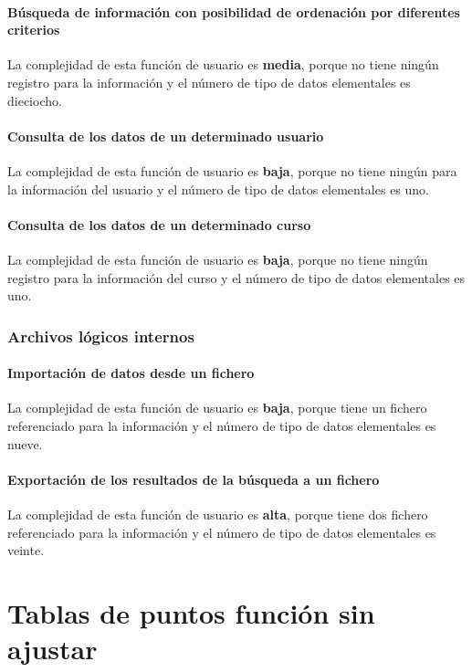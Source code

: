 \documentclass[11pt,a4paper,spanish,twoside]{book}
\begin{document}
\subsubsection{Búsqueda de información con posibilidad de ordenación por
  diferentes criterios}
La complejidad de esta función de usuario es \textbf{media}, porque no tiene
ningún registro para la información y el número de tipo de datos elementales
es dieciocho.

\subsubsection{Consulta de los datos de un determinado usuario}
La complejidad de esta función de usuario es \textbf{baja}, porque no tiene
ningún para la información del usuario y el número de tipo de datos
elementales es uno.

\subsubsection{Consulta de los datos de un determinado curso}
La complejidad de esta función de usuario es \textbf{baja}, porque no tiene
ningún registro para la información del curso y el número de tipo de datos
elementales es uno.

\subsection{Archivos lógicos internos}
\subsubsection{Importación de datos desde un fichero}
La complejidad de esta función de usuario es \textbf{baja}, porque tiene un
fichero referenciado para la información y el número de tipo de datos
elementales es nueve.

\subsubsection{Exportación de los resultados de la búsqueda a un fichero}
La complejidad de esta función de usuario es \textbf{alta}, porque tiene dos
fichero referenciado para la información y el número de tipo de datos
elementales es veinte.

\chapter{Tablas de puntos función sin ajustar}
\end{document}
